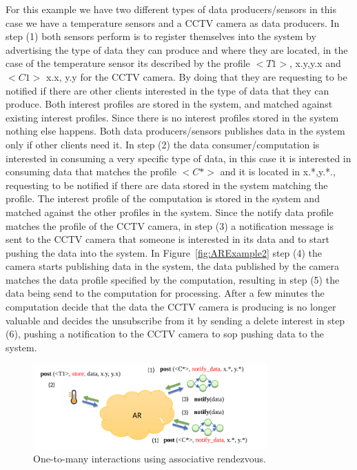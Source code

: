 For this example we have two different types of data producers/sensors in this case we have a temperature sensors and a CCTV camera as data producers. In step (1) both sensors perform is to register themselves into the system by advertising the type of data they can produce and where they are located, in the case of the temperature sensor its described by the profile $<T1>$, x.y,y.x and $<C1>$ x.x, y.y for the CCTV camera. By doing that they are requesting to be notified if there are other clients interested in the type of data that they can produce. Both interest profiles are stored in the system, and matched against existing interest profiles. Since there is no interest profiles stored in the system nothing else happens. Both data producers/sensors publishes data in the system only if other clients need it. In step (2) the data consumer/computation is interested in consuming a very specific type of data, in this case it is interested in consuming data that matches the profile $<C*>$ and it is located in x.*,y.*.,  requesting to be notified if there are data stored in the system matching the profile. The interest profile of the computation is stored in the system and matched against the other profiles in the system. Since the notify data profile matches the profile of the CCTV camera, in step (3) a notification message is sent to the CCTV camera that someone is interested in its data and to start pushing the data into the system. In Figure~\ref{fig:ARExample2} step (4) the camera starts publishing data in the system, the data published by the camera matches the data profile specified by the computation,  resulting in step (5) the data being send to the computation for processing. After a few minutes the computation decide that the data the CCTV camera is producing is no longer valuable and decides the unsubscribe from it by sending a delete interest in step (6), pushing a notification to the CCTV camera to sop pushing data to the system.

\begin{figure}[h!]
  \centering
  \includegraphics[width=0.8\textwidth]{Figures/AR_Example_Multi.pdf}
  \caption{One-to-many interactions using associative rendezvous.}
  \label{fig:AR-Multi}
\end{figure}

